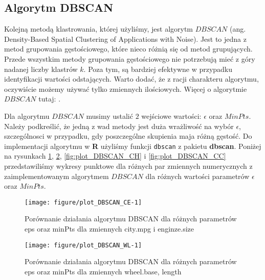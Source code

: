 \documentclass[12pt, a4paper]{article}\usepackage[]{graphicx}\usepackage[]{xcolor}
\makeatletter
\def\maxwidth{ %
  \ifdim\Gin@nat@width>\linewidth
    \linewidth
  \else
    \Gin@nat@width
  \fi
}
\newenvironment{knitrout}{}{} %
\makeatother
\begin{document}
\subsection{Algorytm DBSCAN}

Kolejną metodą klastrowania, której użyliśmy, jest algorytm $DBSCAN$ (ang. Density-Based Spatial Clustering of Applications with Noise). Jest to jedna z metod grupowania gęstościowego, które nieco różnią się od metod grupujących. Przede wszystkim metody grupowania gęstościowego nie potrzebują mieć z góry nadanej liczby klastrów $k$. Poza tym, są bardziej efektywne w przypadku identyfikacji wartości odstających. Warto dodać, że z racji charakteru algorytmu, oczywiście możemy używać tylko zmiennych ilościowych. Więcej o algorytmie $DBSCAN$ tutaj: \cite{DBSCAN}.
\par
Dla algorytmu $DBSCAN$ musimy ustalić $2$ wejściowe wartości: $\epsilon$ oraz $MinPts$. Należy podkreślić, że jedną z wad metody jest duża wrażliwość na wybór $\epsilon$, szczególnosci w przypadku, gdy poszczególne skupienia maja różną gęstość. Do implementacji algorytmu w \textbf{R} użyliśmy funkcji \texttt{dbscan} z pakietu
\textbf{dbscan}. Poniżej na rysunkach \ref{fig:plot_DBSCAN_CE}, \ref{fig:plot_DBSCAN_WL}, \ref{fig:plot_DBSCAN_CH} i \ref{fig:plot_DBSCAN_CC} przedstawiliśmy wykresy punktowe dla różnych par zmiennych numerycznych z zaimplementowanym algorytmem $DBSCAN$ dla różnych wartości parametrów $\epsilon$ oraz $MinPts$.

\begin{knitrout}
\color{fgcolor}\begin{figure}[H]

{\centering \texttt{[image: figure/plot\_DBSCAN\_CE-1]} 

}

\caption[Porównanie działania algorytmu DBSCAN dla różnych parametrów eps oraz minPts dla zmiennych city.mpg i enginze.size]{Porównanie działania algorytmu DBSCAN dla różnych parametrów eps oraz minPts dla zmiennych city.mpg i enginze.size}\label{fig:plot_DBSCAN_CE}
\end{figure}

\end{knitrout}

\begin{knitrout}
\color{fgcolor}\begin{figure}[H]

{\centering \texttt{[image: figure/plot\_DBSCAN\_WL-1]} 

}

\caption[Porównanie działania algorytmu DBSCAN dla różnych parametrów eps oraz minPts dla zmiennych wheel.base, length]{Porównanie działania algorytmu DBSCAN dla różnych parametrów eps oraz minPts dla zmiennych wheel.base, length}\label{fig:plot_DBSCAN_WL}
\end{figure}

\end{knitrout}
\end{document}
